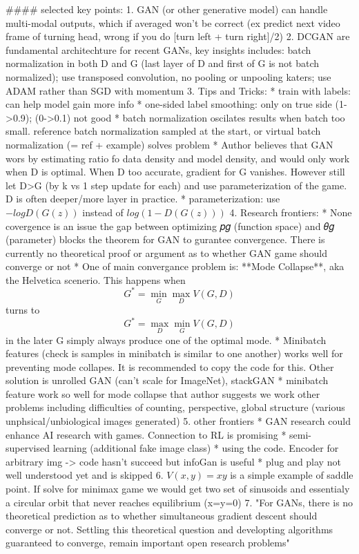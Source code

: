 #### selected key points:
1. GAN (or other generative model) can handle multi-modal outputs, which if averaged won't be correct (ex predict next video frame of turning head, wrong if you do [turn left + turn right]/2)
2. DCGAN are fundamental architechture for recent GANs, key insights includes: batch normalization in both D and G (last layer of D and first of G is not batch normalized); use transposed convolution, no pooling or unpooling katers; use ADAM rather than SGD with momentum
3. Tips and Tricks:
    * train with labels: can help model gain more info
    * one-sided label smoothing: only on true side (1->0.9); (0->0.1) not good
    * batch normalization oscilates results when batch too small. reference batch normalization sampled at the start, or virtual batch normalization (= ref + example) solves problem
    * Author believes that GAN wors by estimating ratio fo data density and model density, and would only work when D is optimal. When D too accurate, gradient for G vanishes. However still let D>G (by k vs 1 step update for each) and use parameterization of the game. D is often deeper/more layer in practice. 
    * parameterization: use $-logD(G(z))$ instead of $log(1-D(G(z)))$
4. Research frontiers:
    * None covergence is an issue the gap between optimizing 𝑝𝑔 (function space) and 𝜃𝑔 (parameter) blocks the theorem for GAN to gurantee convergence. There is currently no theoretical proof or argument as to whether GAN game should converge or not
    * One of main convergance problem is: **Mode Collapse**, aka the Helvetica scenerio. This happens when $$G^* = \min\limits_G\max\limits_DV(G,D)$$ turns to $$G^* = \max\limits_D\min\limits_GV(G,D)$$ in the later G simply always produce one of the optimal mode.
    * Minibatch features (check is samples in minibatch is similar to one another) works well for preventing mode collapes. It is recommended to copy the code for this. Other solution is unrolled GAN (can't scale for ImageNet), stackGAN
    * minibatch feature work so well for mode collapse that author suggests we work other problems including difficulties of counting, perspective, global structure (various unphsical/unbiological images generated) 
5. other frontiers
    * GAN research could enhance AI research with games. Connection to RL is promising
    * semi-supervised learning (additional fake image class)
    * using the code. Encoder for arbitrary img -> code hasn't succeed but infoGan is useful
    *  plug and play not well understood yet and is skipped
6. $V(x,y) = xy$ is a simple example of saddle point. If solve for minimax game we would get two set of sinusoids and essentialy a circular orbit that never reaches equilibrium (x=y=0) 
7. "For GANs, there is no theoretical prediction as to whether simultaneous gradient descent should converge or not. Settling this theoretical question and developting algorithms guaranteed to converge, remain important open research problems"


